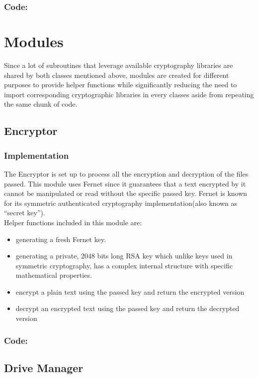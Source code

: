 \documentclass[12pt]{article}
\begin{document}
\subsubsection*{Code:}

\newpage
\section*{Modules}
Since a lot of subroutines that leverage available cryptography libraries are shared by both classes mentioned above, modules are created for different purposes to provide helper functions while significantly reducing the need to import corresponding cryptographic libraries in every classes aside from repeating the same chunk of code. \\
\subsection*{Encryptor}
\subsubsection*{Implementation}
The Encryptor is set up to process all the encryption and decryption of the files passed. This module uses Fernet since it guarantees that a text encrypted by it cannot be manipulated or read without the specific passed key. Fernet is known for its symmetric authenticated cryptography implementation(also known as “secret key”). \\

Helper functions included in this module are:
\begin{itemize}
\item generating a fresh Fernet key.
\item generating a private, 2048 bits long RSA key which unlike keys used in symmetric cryptography, has a complex internal structure with specific mathematical properties.
\item encrypt a plain text using the passed key and return the encrypted version
\item decrypt an encrypted text using the passed key and  return the decrypted version
\end{itemize} 
\vspace*{10mm}
\subsubsection*{Code:}

\newpage
\subsection*{Drive Manager}
\end{document}

